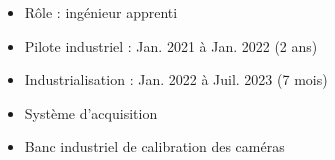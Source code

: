 \documentclass{article}
\begin{document}
\begin{tabular}
\begin{itemize}[label={}, topsep=8pt, partopsep=0pt, itemsep=0.5pt, parsep=2pt, after=\vspace*{-\baselineskip}]
\begin{itemize}[label={\textcolor{gray!80}{\checkmark}}, topsep=8pt, partopsep=0pt, itemsep=0.5pt, parsep=2pt]
            \item \textcolor{gray!80}{Rôle : ingénieur apprenti}
            \item \textcolor{gray!80}{Pilote industriel : Jan. 2021 à Jan. 2022 (2 ans)}
            \item \textcolor{gray!80}{Industrialisation : Jan. 2022 à Juil. 2023 (7 mois)}
            \item \textcolor{gray!80}{Système d'acquisition}
            \item \textcolor{gray!80}{Banc industriel de calibration des caméras}
        \end{itemize}
    \end{itemize}
\end{tabular}

\begin{center}
\end{center}
\end{document}
